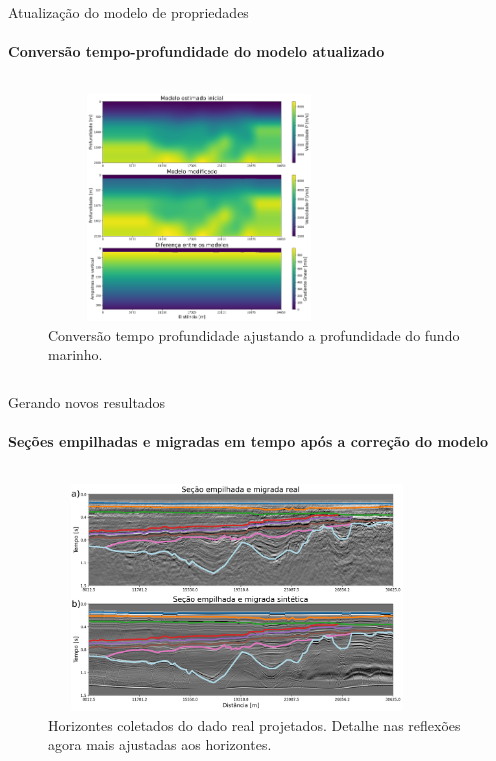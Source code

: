 \documentclass[xcolor=dvipsnames,t]{beamer}
\begin{document}
\begin{frame}{Atualização do modelo de propriedades}
	\framesubtitle{Conversão tempo-profundidade do modelo atualizado}	
	
	\begin{columns}[onlytextwidth, T]
		\begin{column}{.9\textwidth}
			\begin{figure}[h]
				\includegraphics[width=8cm,height=6cm]{../imagens/modificationDepth.png}	
				\tiny{\caption{Conversão tempo profundidade ajustando a profundidade do fundo marinho.}}
			\end{figure}			
		\end{column}
	\end{columns}		
	
\end{frame}
\begin{frame}{Gerando novos resultados}
	\framesubtitle{Seções empilhadas e migradas em tempo após a correção do modelo}	
	
	\begin{columns}[onlytextwidth, T]
		\begin{column}{.9\textwidth}
			\begin{figure}[h]
				\includegraphics[width=10cm,height=6cm]{../imagens/comparision1HRZ.png}	
				\tiny{\caption{Horizontes coletados do dado real projetados. Detalhe nas reflexões agora mais ajustadas aos horizontes.}} 	
			\end{figure}			
		\end{column}
	\end{columns}	
	
\end{frame}
\end{document}
